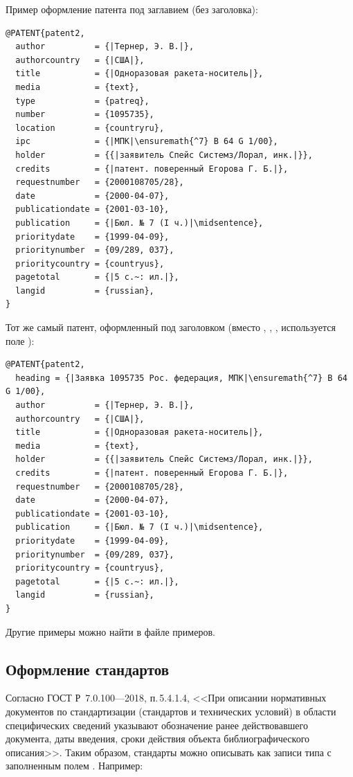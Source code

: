 \documentclass[10pt,a4paper,headings=small,numbers=enddot,english,russian]{ltxdockit}
\newcommand*{\gostbibname}[1][]{ГОСТ#1 Р~7.0.100---2018\xspace}
\newcommand*{\gostbibref}[2][]{\gostbibname[#1], п.\,#2\xspace}
\begin{document}
Пример оформление патента под заглавием (без заголовка):
\begin{lstlisting}[style=bibtex,escapechar=|]
@PATENT{patent2,
  author          = {|Тернер, Э. В.|},
  authorcountry   = {|США|},
  title           = {|Одноразовая ракета-носитель|},
  media           = {text},
  type            = {patreq},
  number          = {1095735},
  location        = {countryru},
  ipc             = {|МПК|\ensuremath{^7} B 64 G 1/00},
  holder          = {{|заявитель Спейс Системз/Лорал, инк.|}},
  credits         = {|патент. поверенный Егорова Г. Б.|},
  requestnumber   = {2000108705/28},
  date            = {2000-04-07},
  publicationdate = {2001-03-10},
  publication     = {|Бюл. № 7 (I ч.)|\midsentence},
  prioritydate    = {1999-04-09},
  prioritynumber  = {09/289, 037},
  prioritycountry = {countryus},
  pagetotal       = {|5 с.~: ил.|},
  langid          = {russian},
}
\end{lstlisting}

Тот же самый патент, оформленный под заголовком (вместо
, , , 
используется поле ):

\begin{lstlisting}[style=bibtex,escapechar=|]
@PATENT{patent2,
  heading = {|Заявка 1095735 Рос. федерация, МПК|\ensuremath{^7} B 64 G 1/00},
  author          = {|Тернер, Э. В.|},
  authorcountry   = {|США|},
  title           = {|Одноразовая ракета-носитель|},
  media           = {text},
  holder          = {{|заявитель Спейс Системз/Лорал, инк.|}},
  credits         = {|патент. поверенный Егорова Г. Б.|},
  requestnumber   = {2000108705/28},
  date            = {2000-04-07},
  publicationdate = {2001-03-10},
  publication     = {|Бюл. № 7 (I ч.)|\midsentence},
  prioritydate    = {1999-04-09},
  prioritynumber  = {09/289, 037},
  prioritycountry = {countryus},
  pagetotal       = {|5 с.~: ил.|},
  langid          = {russian},
}
\end{lstlisting}

Другие примеры можно найти в файле примеров.

\subsection{Оформление стандартов}
\label{sec:standards}

Согласно \gostbibref{5.4.1.4},
<<При описании нормативных документов по стандартизации (стандартов и технических
условий) в области специфических сведений указывают обозначение ранее действовавшего документа,
даты введения, сроки действия объекта библиографического описания>>.
Таким образом, стандарты можно описывать как записи типа  с
заполненным полем . Например:
\end{document}
